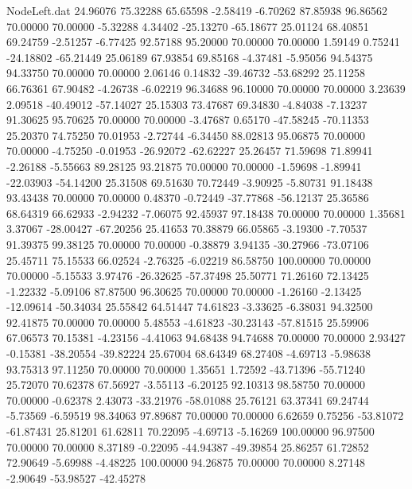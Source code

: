 \begin{filecontents}{NodeLeft.dat}
  24.96076   75.32288   65.65598    -2.58419   -6.70262   87.85938   96.86562   70.00000   70.00000   -5.32288    4.34402  -25.13270  -65.18677
  25.01124   68.40851   69.24759    -2.51257   -6.77425   92.57188   95.20000   70.00000   70.00000    1.59149    0.75241  -24.18802  -65.21449
  25.06189   67.93854   69.85168    -4.37481   -5.95056   94.54375   94.33750   70.00000   70.00000    2.06146    0.14832  -39.46732  -53.68292
  25.11258   66.76361   67.90482    -4.26738   -6.02219   96.34688   96.10000   70.00000   70.00000    3.23639    2.09518  -40.49012  -57.14027
  25.15303   73.47687   69.34830    -4.84038   -7.13237   91.30625   95.70625   70.00000   70.00000   -3.47687    0.65170  -47.58245  -70.11353
  25.20370   74.75250   70.01953    -2.72744   -6.34450   88.02813   95.06875   70.00000   70.00000   -4.75250   -0.01953  -26.92072  -62.62227
  25.26457   71.59698   71.89941    -2.26188   -5.55663   89.28125   93.21875   70.00000   70.00000   -1.59698   -1.89941  -22.03903  -54.14200
  25.31508   69.51630   70.72449    -3.90925   -5.80731   91.18438   93.43438   70.00000   70.00000    0.48370   -0.72449  -37.77868  -56.12137
  25.36586   68.64319   66.62933    -2.94232   -7.06075   92.45937   97.18438   70.00000   70.00000    1.35681    3.37067  -28.00427  -67.20256
  25.41653   70.38879   66.05865    -3.19300   -7.70537   91.39375   99.38125   70.00000   70.00000   -0.38879    3.94135  -30.27966  -73.07106
  25.45711   75.15533   66.02524    -2.76325   -6.02219   86.58750  100.00000   70.00000   70.00000   -5.15533    3.97476  -26.32625  -57.37498
  25.50771   71.26160   72.13425    -1.22332   -5.09106   87.87500   96.30625   70.00000   70.00000   -1.26160   -2.13425  -12.09614  -50.34034
  25.55842   64.51447   74.61823    -3.33625   -6.38031   94.32500   92.41875   70.00000   70.00000    5.48553   -4.61823  -30.23143  -57.81515
  25.59906   67.06573   70.15381    -4.23156   -4.41063   94.68438   94.74688   70.00000   70.00000    2.93427   -0.15381  -38.20554  -39.82224
  25.67004   68.64349   68.27408    -4.69713   -5.98638   93.75313   97.11250   70.00000   70.00000    1.35651    1.72592  -43.71396  -55.71240
  25.72070   70.62378   67.56927    -3.55113   -6.20125   92.10313   98.58750   70.00000   70.00000   -0.62378    2.43073  -33.21976  -58.01088
  25.76121   63.37341   69.24744    -5.73569   -6.59519   98.34063   97.89687   70.00000   70.00000    6.62659    0.75256  -53.81072  -61.87431
  25.81201   61.62811   70.22095    -4.69713   -5.16269  100.00000   96.97500   70.00000   70.00000    8.37189   -0.22095  -44.94387  -49.39854
  25.86257   61.72852   72.90649    -5.69988   -4.48225  100.00000   94.26875   70.00000   70.00000    8.27148   -2.90649  -53.98527  -42.45278

\end{filecontents}
